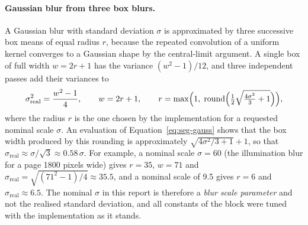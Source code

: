 \paragraph{Gaussian blur from three box blurs.}
A Gaussian blur with standard deviation $\sigma$ is approximated by three successive box means of equal radius $r$, because the repeated convolution of a uniform kernel converges to a Gaussian shape by the central-limit argument.
A single box of full width $w=2r+1$ has the variance $(w^2-1)/12$, and three independent passes add their variances to
\begin{equation}
\sigma_{\mathrm{real}}^2=\frac{w^2-1}{4},\qquad w=2r+1,\qquad r=\max\Bigl(1,\;\mathrm{round}\Bigl(\tfrac12\sqrt{\tfrac{4\sigma^2}{3}+1}\Bigr)\Bigr),
\label{eq:seg-gauss}
\end{equation}
where the radius $r$ is the one chosen by the implementation for a requested nominal scale $\sigma$.
An evaluation of Equation~\ref{eq:seg-gauss} shows that the box width produced by this rounding is approximately $\sqrt{4\sigma^2/3+1}+1$, so that $\sigma_{\mathrm{real}}\approx\sigma/\sqrt3\approx0.58\,\sigma$.
For example, a nominal scale $\sigma=60$ (the illumination blur for a page 1800 pixels wide) gives $r=35$, $w=71$ and $\sigma_{\mathrm{real}}=\sqrt{(71^2-1)/4}\approx35.5$, and a nominal scale of 9.5 gives $r=6$ and $\sigma_{\mathrm{real}}\approx6.5$.
The nominal $\sigma$ in this report is therefore a \emph{blur scale parameter} and not the realised standard deviation, and all constants of the block were tuned with the implementation as it stands.


